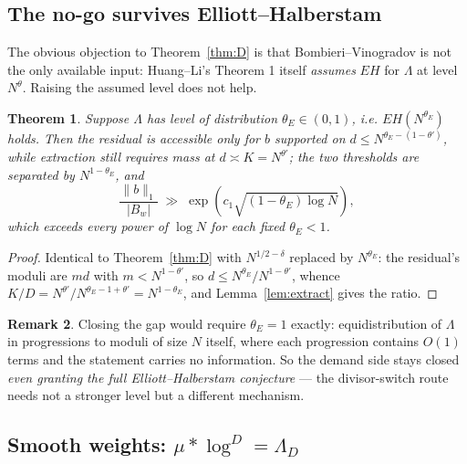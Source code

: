 \documentclass[11pt,a4paper]{article}
\theoremstyle{plain}
\newtheorem{theorem}{Theorem}
\theoremstyle{definition}
\newtheorem{remark}[theorem]{Remark}
\begin{document}
\subsection{The no-go survives Elliott--Halberstam}

The obvious objection to Theorem~\ref{thm:D} is that
Bombieri--Vinogradov is not the only available input: Huang--Li's
Theorem 1 itself \emph{assumes} $EH$ for $\Lambda$ at level
$N^{\theta}$. Raising the assumed level does not help.

\begin{theorem}\label{thm:Dprime}
Suppose $\Lambda$ has level of distribution $\theta_E \in (0,1)$, i.e.
$EH(N^{\theta_E})$ holds. Then the residual is accessible only for $b$
supported on $d \le N^{\theta_E-(1-\theta')}$, while extraction still
requires mass at $d \asymp K = N^{\theta'}$; the two thresholds are
separated by $N^{1-\theta_E}$, and
\[
  \frac{\|b\|_1}{|B_w|} \;\gg\;
  \exp\!\left(c_1\sqrt{(1-\theta_E)\log N}\right),
\]
which exceeds every power of $\log N$ for each fixed $\theta_E<1$.
\end{theorem}

\begin{proof}
Identical to Theorem~\ref{thm:D} with $N^{1/2-\delta}$ replaced by
$N^{\theta_E}$: the residual's moduli are $md$ with $m<N^{1-\theta'}$,
so $d \le N^{\theta_E}/N^{1-\theta'}$, whence
$K/D = N^{\theta'}/N^{\theta_E-1+\theta'} = N^{1-\theta_E}$, and
Lemma~\ref{lem:extract} gives the ratio.
\end{proof}

\begin{remark}
Closing the gap would require $\theta_E = 1$ exactly: equidistribution
of $\Lambda$ in progressions to moduli of size $N$ itself, where each
progression contains $O(1)$ terms and the statement carries no
information. So the demand side stays closed \emph{even granting the
full Elliott--Halberstam conjecture} --- the divisor-switch route needs
not a stronger level but a different mechanism.
\end{remark}

\subsection{Smooth weights: $\mu * \log^D = \Lambda_D$}
\label{sec:Dpp}
\end{document}
